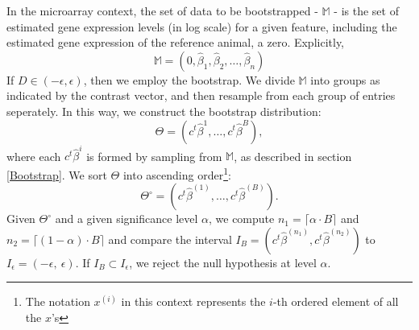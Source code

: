 In the microarray context, the set of data to be bootstrapped - $\mathbb{M}$ - is the set of estimated gene expression levels (in log scale) for a given feature, including the estimated gene expression of the reference animal, a zero. Explicitly, $$ \mathbb{M} = \left(0, \hat{\beta}_1, \hat{\beta}_2, \dots, \hat{\beta}_n \right)$$ If $D \in  (-\epsilon, \epsilon)$, then we employ the bootstrap.  We divide $\mathbb{M}$ into groups as indicated by the contrast vector, and then resample from each group of entries seperately. In this way, we construct the bootstrap distribution: $$\Theta = \left( c^t \hat{\beta}^1, \dots, c^t  \hat{\beta}^B \right),$$ where each $c^t \hat{\beta}^i$ is formed by sampling from $\mathbb{M}$, as described in section \ref{Bootstrap}. We sort $\Theta$ into ascending order\footnote{The notation $x^{(i)}$ in this context represents the $i$-th ordered element of all the $x$'s}: $$\Theta^\circ = \left(c^t \hat{\beta}^{(1)}, \dots, c^t \hat{\beta}^{(B)}\right).$$ Given $\Theta^\circ$ and a given significance level $\alpha$, we compute $n_{1} = \lceil \alpha \cdot B \rceil$ and $n_2 = \lceil (1 - \alpha) \cdot B \rceil$ and compare the interval $I_B = ( c^t\hat{\beta}^{(n_1)},  c^t\hat{\beta}^{(n_2)})$ to  $I_\epsilon = (-\epsilon,\  \epsilon)$. If $I_B \subset I_\epsilon$, we reject the null hypothesis at level $\alpha$.
 
